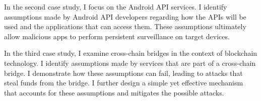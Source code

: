 \begin{dissertationintroduction}
In the second case study, I focus on the Android API services. I identify assumptions made by Android API developers regarding how the APIs will be used and the applications that can access them. These assumptions ultimately allow malicious apps to perform persistent surveillance on target devices.

In the third case study, I examine cross-chain bridges in the context of blockchain technology. I identify assumptions made by services that are part of a cross-chain bridge. I demonstrate how these assumptions can fail, leading to attacks that steal funds from the bridge. I further design a simple yet effective mechanism that accounts for these assumptions and mitigates the possible attacks.





% 









\end{dissertationintroduction}

